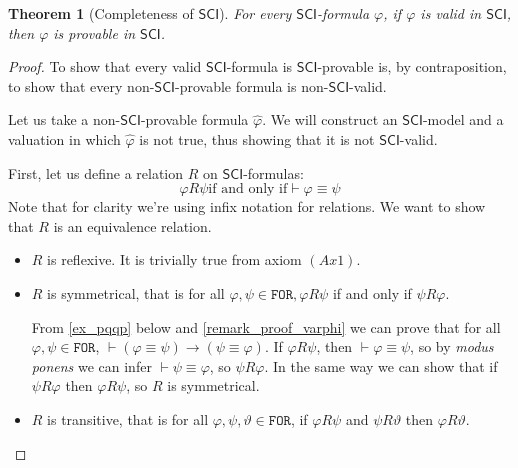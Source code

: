 \documentclass{article}
\newtheorem{theorem}{Theorem}
\theoremstyle{definition}
\theoremstyle{definition}
\theoremstyle{definition}
\newcommand*{\id}{\equiv}
\newcommand*{\ra}{\rightarrow}
\newcommand*{\FOR}{\texttt{FOR}}
\newcommand{\SCI}{$\mathsf{SCI}$\xspace}
\begin{document}
\begin{theorem}[Completeness of \SCI]
    For every \SCI-formula $\varphi$, if $\varphi$ is valid in \SCI, then $\varphi$ is provable in \SCI.
\end{theorem}
\begin{proof}
    To show that every valid \SCI-formula is \SCI-provable is, by contraposition, to show that every non-\SCI-provable formula is non-\SCI-valid.

    Let us take a non-\SCI-provable formula $\hat{\varphi}$. We will construct an
    \SCI-model and a valuation in which $\hat{\varphi}$ is not true, thus showing
    that it is not \SCI-valid.

    First, let us define a relation $R$ on \SCI-formulas: $$ \varphi R \psi \text{
            if and only if} \vdash \varphi \id \psi $$
    Note that for clarity we're using infix notation for relations. We want to show
    that $R$ is an equivalence relation.
    \begin{itemize}[]
        \item $R$ is reflexive. It is trivially true from axiom $(Ax1)$.
        \item $R$ is symmetrical, that is for all $\varphi, \psi \in \FOR, \varphi R \psi$ if and only if $\psi R \varphi$.

              From \cref{ex_pqqp} below and \cref{remark_proof_varphi} we can prove that for
              all $\varphi, \psi \in \FOR$, $\vdash (\varphi \id \psi) \ra (\psi \id
                  \varphi)$. If $\varphi R \psi$, then $\vdash \varphi \id \psi$, so by
              \emph{modus ponens} we can infer $\vdash \psi \id \varphi$, so $\psi R
                  \varphi$. In the same way we can show that if $\psi R \varphi$ then $\varphi R
                  \psi$, so $R$ is symmetrical.
        \item $R$ is transitive, that is for all $\varphi, \psi, \vartheta \in \FOR$, if $\varphi R \psi$ and $\psi R \vartheta$ then $\varphi R \vartheta$.


\end{itemize}
\end{proof}
\end{document}

